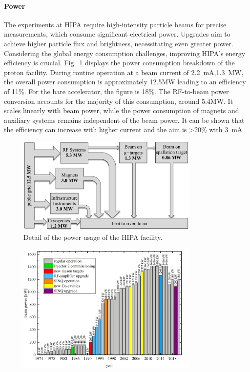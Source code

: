 \begin{refsection}
        \paragraph{Power} The experiments at HIPA require high-intensity particle beams for precise measurements, which consume significant electrical power. 
        Upgrades aim to achieve higher particle flux and brightness, necessitating even greater power. 
        Considering the global energy consumption challenges, improving HIPA's energy efficiency is crucial. 
        Fig.~\ref{fig:PSI:HIPA:consumption} displays the power consumption breakdown of the proton facility. 
        During routine operation at a beam current of \SI{2.2}{mA},\SI{1.3}{MW}, the overall power consumption is approximately 12.5MW leading to an efficiency of 11\%.
        For the bare accelerator, the figure is 18\%.
        The RF-to-beam power conversion accounts for the majority of this consumption, around 5.4MW. 
        It scales linearly with beam power, while the power consumption of magnets and auxiliary systems remains independent of the beam power.
        It can be shown that the efficiency can increase with higher current and the aim is >20\% with \SI{3}{mA}
        \begin{figure}
            \centering
            \includegraphics[width = 0.8\textwidth]{Figures/Introduction/PSI_HIPA_consumption.png}
            \caption[HIPA: power usage]{Detail of the power usage of the HIPA facility.}
            \label{fig:PSI:HIPA:consumption}
        \end{figure}
        \begin{figure}
            \centering
            \includegraphics[width = 0.8\textwidth]{Figures/Introduction/PSI_HIPA_power.png}

\end{figure}
\end{refsection}
